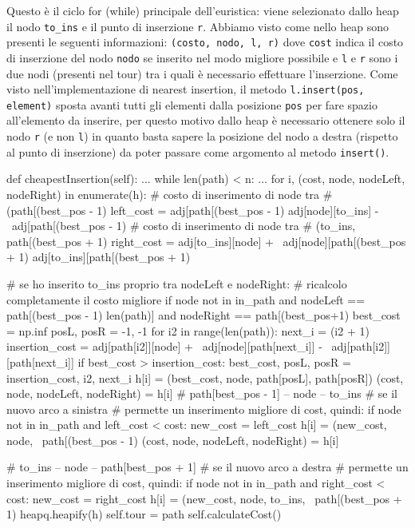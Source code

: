 \documentclass[a4paper,12pt]{report}
\begin{document}
Questo è il ciclo for (while) principale dell'euristica: viene selezionato dallo heap il nodo \lstinline!to_ins! e il punto di inserzione \lstinline!r!. Abbiamo visto come nello heap sono presenti le seguenti informazioni: \lstinline!(costo, nodo, l, r)! dove \lstinline!cost! indica il costo di inserzione del nodo \lstinline!nodo! se inserito nel modo migliore possibile e \lstinline!l! e \lstinline!r! sono i due nodi (presenti nel tour) tra i quali è necessario effettuare l'inserzione. Come visto nell'implementazione di nearest insertion, il metodo \lstinline!l.insert(pos, element)! sposta avanti tutti gli elementi dalla posizione \lstinline!pos! per fare spazio all'elemento da inserire, per questo motivo dallo heap è necessario ottenere solo il nodo \lstinline!r! (e non \lstinline!l!) in quanto basta sapere la posizione del nodo a destra (rispetto al punto di inserzione) da poter passare come argomento al metodo \lstinline!insert()!.
\begin{python}
def cheapestInsertion(self):
  ...
  while len(path) < n:
    ...
    for i, (cost, node, nodeLeft, nodeRight) in enumerate(h):
      # costo di inserimento di node tra
      # (path[(best_pos - 1) %
      left_cost = adj[path[(best_pos - 1) %
                  adj[node][to_ins] - \
                  adj[path[(best_pos - 1) %
      # costo di inserimento di node tra 
      # (to_ins, path[(best_pos + 1) %
      right_cost = adj[to_ins][node] + \
                   adj[node][path[(best_pos + 1) %
                   adj[to_ins][path[(best_pos + 1) %

      # se ho inserito to_ins proprio tra nodeLeft e nodeRight:
      # ricalcolo completamente il costo migliore
      if node not in in_path and nodeLeft == path[(best_pos - 1) %
        len(path)] and nodeRight == path[(best_pos+1) %
        best_cost = np.inf
        posL, posR = -1, -1
        for i2 in range(len(path)):
          next_i = (i2 + 1) %
          insertion_cost = adj[path[i2]][node] + \
                           adj[node][path[next_i]] - \
                           adj[path[i2]][path[next_i]]
          if best_cost > insertion_cost:
            best_cost, posL, posR = insertion_cost, i2, next_i
        h[i] = (best_cost, node, path[posL], path[posR])
        (cost, node, nodeLeft, nodeRight) = h[i]
      # path[best_pos - 1] -- node -- to_ins
      # se il nuovo arco a sinistra
      # permette un inserimento migliore di cost, quindi:
      if node not in in_path and left_cost < cost:
        new_cost = left_cost
        h[i] = (new_cost, node, \
                path[(best_pos - 1) %
        (cost, node, nodeLeft, nodeRight) = h[i]

      # to_ins -- node -- path[best_pos + 1] 
      # se il nuovo arco a destra
      # permette un inserimento migliore di cost, quindi:
      if node not in in_path and right_cost < cost:
        new_cost = right_cost
        h[i] = (new_cost, node, to_ins, \
                path[(best_pos + 1) %
    heapq.heapify(h)
  self.tour = path
  self.calculateCost()
\end{python}
\end{document}
